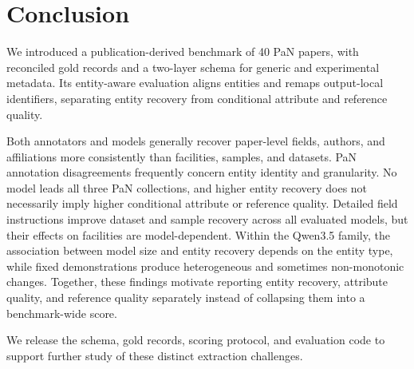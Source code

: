 \section{Conclusion}
\label{sec:conclusion}

We introduced a publication-derived benchmark of 40 PaN papers, with reconciled 
gold records and a two-layer schema for generic and experimental metadata. 
Its entity-aware evaluation aligns entities and remaps output-local identifiers, 
separating entity recovery from conditional attribute and reference quality.

Both annotators and models generally recover paper-level fields, authors,
and affiliations more consistently than facilities, samples, and datasets. 
PaN annotation disagreements frequently concern entity identity and granularity. 
No model leads all three PaN collections, and higher entity recovery does not 
necessarily imply higher conditional attribute or reference quality. Detailed field 
instructions improve dataset and sample recovery across all evaluated models, but 
their effects on facilities are model-dependent. Within the Qwen3.5 family, the 
association between model size and entity recovery depends on the entity
type, while fixed demonstrations produce heterogeneous and sometimes
non-monotonic changes. Together, these findings motivate reporting entity
recovery, attribute quality, and reference quality separately instead of
collapsing them into a benchmark-wide score.

We release the schema, gold records, scoring protocol, and evaluation code to 
support further study of these distinct extraction challenges.
